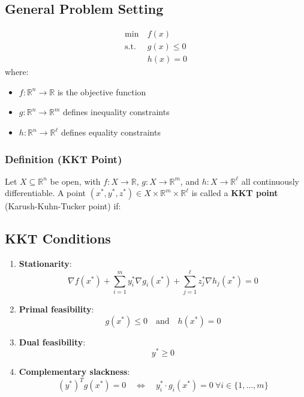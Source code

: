 \documentclass{article}
\begin{document}
\subsection*{General Problem Setting}
\begin{align*}
\min\ & f(x) \\
\text{s.t.}\ & g(x) \leq 0 \\
& h(x) = 0
\end{align*}
where:
\begin{itemize}
\item $f: \mathbb{R}^n \rightarrow \mathbb{R}$ is the objective function
\item $g: \mathbb{R}^n \rightarrow \mathbb{R}^m$ defines inequality constraints
\item $h: \mathbb{R}^n \rightarrow \mathbb{R}^\ell$ defines equality constraints
\end{itemize}

\subsubsection*{Definition (KKT Point)}
Let $X \subseteq \mathbb{R}^n$ be open, with $f:X\rightarrow\mathbb{R}$, $g:X\rightarrow\mathbb{R}^m$, and $h:X\rightarrow\mathbb{R}^\ell$ all continuously differentiable. A point $(x^*, y^*, z^*) \in X \times \mathbb{R}^m \times \mathbb{R}^\ell$ is called a \textbf{KKT point} (Karush-Kuhn-Tucker point) if:

\subsection*{KKT Conditions}
\begin{enumerate}[label=(\arabic*)]
    \item \textbf{Stationarity}:
    \[ \nabla f(x^*) + \sum_{i=1}^m y_i^* \nabla g_i(x^*) + \sum_{j=1}^\ell z_j^* \nabla h_j(x^*) = 0 \]
    
    \item \textbf{Primal feasibility}:
    \[ g(x^*) \leq 0 \quad \text{and} \quad h(x^*) = 0 \]
    
    \item \textbf{Dual feasibility}:
    \[ y^* \geq 0 \]
    
    \item \textbf{Complementary slackness}:
    \[ (y^*)^T g(x^*) = 0 \quad \Leftrightarrow \quad y_i^* \cdot g_i(x^*) = 0 \ \forall i \in \{1,\ldots,m\} \]
\end{enumerate}
\end{document}
